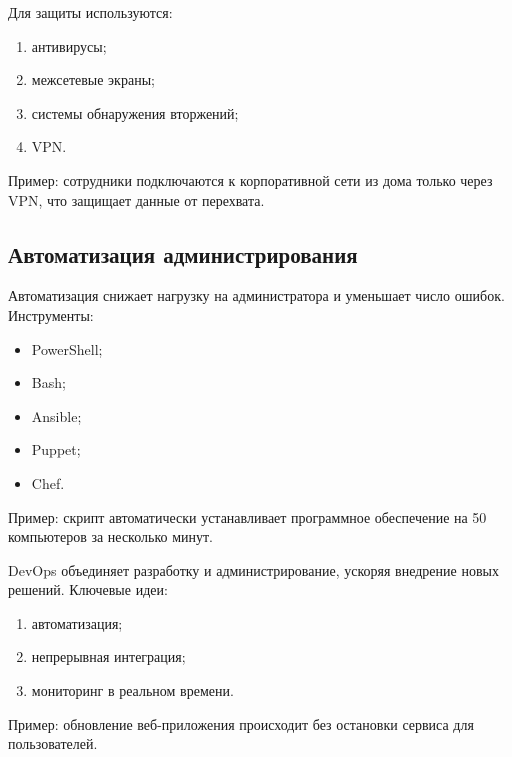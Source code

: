 \documentclass{ou}
\begin{document}
	Для защиты используются:
    \begin{enumerate}[leftmargin=0em, itemindent=3.75em, nosep, label=\arabic*)]
\item антивирусы;
\item межсетевые экраны;
\item системы обнаружения вторжений;
\item VPN.
\end{enumerate}

	Пример: сотрудники подключаются к корпоративной сети из дома только через VPN, что защищает данные от перехвата.
\subsection{Автоматизация администрирования}
	Автоматизация снижает нагрузку на администратора и уменьшает число ошибок. Инструменты:
    \begin{itemize}[label=-, leftmargin=0em, itemindent=3.35em, nosep]
\item PowerShell;
\item Bash;
\item Ansible;
\item Puppet;
\item Chef.
\end{itemize}

	Пример: скрипт автоматически устанавливает программное обеспечение на 50 компьютеров за несколько минут.
	
    DevOps объединяет разработку и администрирование, ускоряя внедрение новых решений. Ключевые идеи:
    \begin{enumerate}[leftmargin=0em, itemindent=3.75em, nosep, label=\arabic*)]
\item автоматизация;
\item непрерывная интеграция;
\item мониторинг в реальном времени.
\end{enumerate}

	Пример: обновление веб-приложения происходит без остановки сервиса для пользователей.
\newpage
{
\sloppy
\nocite{*}
\cleardoublepage
{}


}
\end{document}
